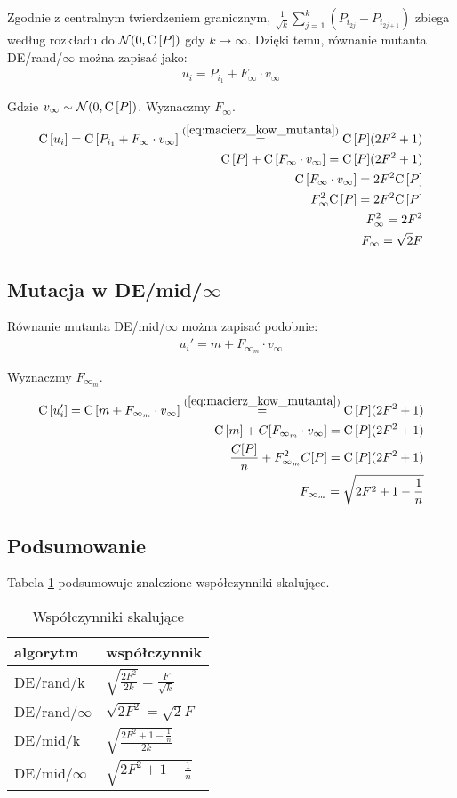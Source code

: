 \documentclass[12pt, a4paper]{article}
\def\C{{\rm C}\,}
\begin{document}
Zgodnie z centralnym twierdzeniem granicznym, $\frac{1}{{\sqrt{k}}}\sum\limits_{j=1}^k (P_{i_{2j}} - P_{i_{2j+1}})$ 
zbiega według rozkładu do $\mathcal{N}(0, \C[P])$ gdy $k \to \infty$. 
Dzięki temu, równanie mutanta DE/rand/$\infty$ można zapisać jako:
\begin{align*}
u_i = P_{i_1} + F_\infty \cdot v_\infty
\end{align*}

Gdzie $v_\infty \sim \mathcal{N}(0, \C[P])$. Wyznaczmy $F_\infty$.
\begin{align*}
\C[u_i] = \C[P_{i_1} + F_\infty \cdot v_\infty] \overset{(\ref{eq:macierz_kow_mutanta})}{=} \C[P](2F^2 + 1) \\
\C[P] + \C[F_\infty \cdot v_\infty] = \C[P](2F^2 + 1) \\
\C[F_\infty \cdot v_\infty] = 2F^2\C[P] \\
F_\infty^2 \C[P] = 2F^2\C[P] \\
F_\infty^2 = 2F^2 \\
F_\infty = \sqrt{2}F
\end{align*}

\subsection{Mutacja w DE/mid/$\infty$}

Równanie mutanta DE/mid/$\infty$ można zapisać podobnie:
\begin{align*}
u_i' = m + F_{\infty_m} \cdot v_\infty
\end{align*}

Wyznaczmy $F_{\infty_m}$.
\begin{align*}
\C[u_i'] = \C[m + F_{\infty_m} \cdot v_\infty] \overset{(\ref{eq:macierz_kow_mutanta})}{=} \C[P](2F^2 + 1) \\
\C[m] + C[F_{\infty_m} \cdot v_\infty] = \C[P](2F^2 + 1) \\
\frac{C[P]}{n} + F_{\infty_m}^2 C[P] = \C[P](2F^2 + 1) \\
F_{\infty_m} = \sqrt{2F^2 + 1 - \frac{1}{n}}
\end{align*}

\subsection{Podsumowanie}

Tabela \ref{table:parametry} podsumowuje znalezione współczynniki skalujące.

\begin{table}[H]
\centering
\begin{tabular}{ l | l }
algorytm         & współczynnik \\ \hline
DE/rand/k        & $\sqrt{\frac{2F^2}{2k}} = \frac{F}{\sqrt{k}}$ \\ 
DE/rand/$\infty$ & $\sqrt{2F^2} = \sqrt{2}F$ \\ \hline
DE/mid/k         & $\sqrt{\frac{2F^2 + 1 - \frac{1}{n}}{2k}}$ \\
DE/mid/$\infty$  & $\sqrt{2F^2 + 1 - \frac{1}{n}}$ \\
\end{tabular}
\caption{Współczynniki skalujące}
\label{table:parametry}
\end{table}
\end{document}
